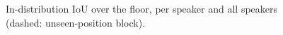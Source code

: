 \begin{figure}[t]
\centering

\caption{In-distribution IoU over the floor, per speaker and all speakers (dashed: unseen-position block).}
\label{fig:floor_map}
\end{figure}
